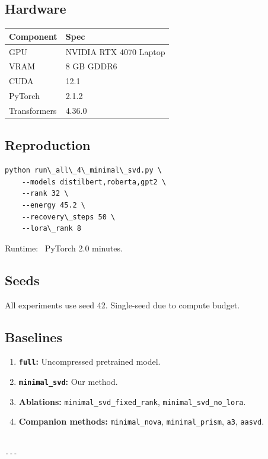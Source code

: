 \subsection{Hardware}

\begin{table}[H]
\centering
\small
\begin{tabular}{ll}
\toprule
\textbf{Component} & \textbf{Spec} \\
\midrule
GPU & NVIDIA RTX 4070 Laptop \\
VRAM & 8 GB GDDR6 \\
CUDA & 12.1 \\
PyTorch & 2.1.2 \\
Transformers & 4.36.0 \\
\bottomrule
\end{tabular}
\end{table}

\subsection{Reproduction}

\begin{lstlisting}
python run\_all\_4\_minimal\_svd.py \
    --models distilbert,roberta,gpt2 \
    --rank 32 \
    --energy 45.2 \
    --recovery\_steps 50 \
    --lora\_rank 8
\end{lstlisting}

Runtime: ~PyTorch 2.0 minutes.

\subsection{Seeds}

All experiments use seed 42. Single-seed due to compute budget.

\subsection{Baselines}

\begin{enumerate}
\item \textbf{\texttt{full}:} Uncompressed pretrained model.
\item \textbf{\texttt{minimal\_svd}:} Our method.
\item \textbf{Ablations:} \texttt{minimal\_svd\_fixed\_rank}, \texttt{minimal\_svd\_no\_lora}.
\item \textbf{Companion methods:} \texttt{minimal\_nova}, \texttt{minimal\_prism}, \texttt{a3}, \texttt{aasvd}.
\end{enumerate}
\begin{lstlisting}

---
\end{lstlisting}

